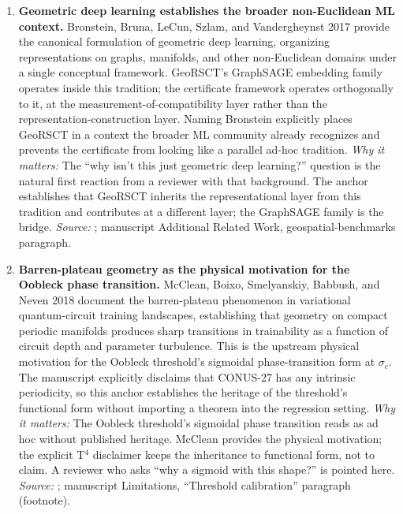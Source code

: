 \documentclass{article}
\begin{document}
\begin{enumerate}
\item \textbf{Geometric deep learning establishes the broader non-Euclidean ML context.}
Bronstein, Bruna, LeCun, Szlam, and Vandergheynst 2017 provide the canonical formulation of geometric deep learning, organizing representations on graphs, manifolds, and other non-Euclidean domains under a single conceptual framework. GeoRSCT's GraphSAGE embedding family operates inside this tradition; the certificate framework operates orthogonally to it, at the measurement-of-compatibility layer rather than the representation-construction layer. Naming Bronstein explicitly places GeoRSCT in a context the broader ML community already recognizes and prevents the certificate from looking like a parallel ad-hoc tradition.
\emph{Why it matters:} The ``why isn't this just geometric deep learning?'' question is the natural first reaction from a reviewer with that background. The anchor establishes that GeoRSCT inherits the representational layer from this tradition and contributes at a different layer; the GraphSAGE family is the bridge.
\emph{Source:} \citet{bronstein2017geometric}; manuscript Additional Related Work, geospatial-benchmarks paragraph.

\item \textbf{Barren-plateau geometry as the physical motivation for the Oobleck phase transition.}
McClean, Boixo, Smelyanskiy, Babbush, and Neven 2018 document the barren-plateau phenomenon in variational quantum-circuit training landscapes, establishing that geometry on compact periodic manifolds produces sharp transitions in trainability as a function of circuit depth and parameter turbulence. This is the upstream physical motivation for the Oobleck threshold's sigmoidal phase-transition form at $\sigma_c$. The manuscript explicitly disclaims that CONUS-27 has any intrinsic periodicity, so this anchor establishes the heritage of the threshold's functional form without importing a theorem into the regression setting.
\emph{Why it matters:} The Oobleck threshold's sigmoidal phase transition reads as ad hoc without published heritage. McClean provides the physical motivation; the explicit T$^4$ disclaimer keeps the inheritance to functional form, not to claim. A reviewer who asks ``why a sigmoid with this shape?'' is pointed here.
\emph{Source:} \citet{mcclean2018barren}; manuscript Limitations, ``Threshold calibration'' paragraph (footnote).


\end{enumerate}
\end{document}
